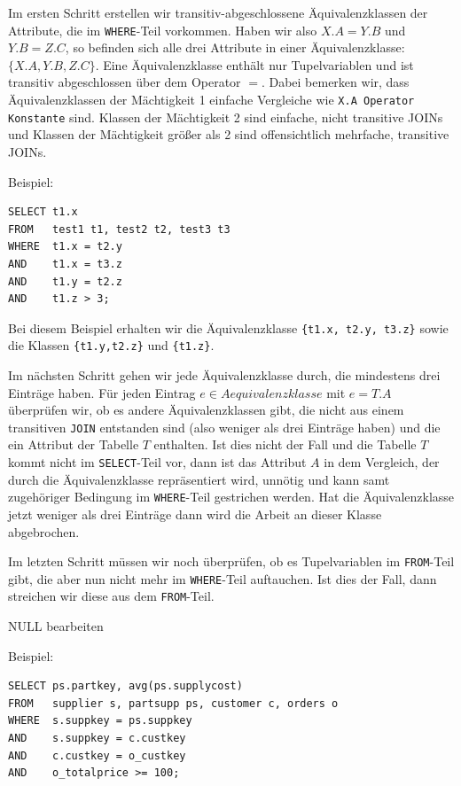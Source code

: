 Im ersten Schritt erstellen wir transitiv-abgeschlossene Äquivalenzklassen der Attribute, die im \verb|WHERE|-Teil vorkommen. Haben wir also $X.A=Y.B$ und $Y.B=Z.C$, so befinden sich alle drei Attribute in einer Äquivalenzklasse: $\{X.A,Y.B,Z.C\}$. Eine Äquivalenzklasse enthält nur Tupelvariablen und ist transitiv abgeschlossen über dem Operator $=$.
Dabei bemerken wir, dass Äquivalenzklassen der Mächtigkeit 1 einfache Vergleiche wie \verb|X.A Operator Konstante| sind. Klassen der Mächtigkeit 2 sind einfache, nicht transitive JOINs und Klassen der Mächtigkeit größer als 2 sind offensichtlich mehrfache, transitive JOINs.

Beispiel:
\begin{lstlisting}[mathescape]
SELECT t1.x 
FROM   test1 t1, test2 t2, test3 t3
WHERE  t1.x = t2.y
AND    t1.x = t3.z
AND    t1.y = t2.z
AND    t1.z > 3;
\end{lstlisting}

Bei diesem Beispiel erhalten wir die Äquivalenzklasse \verb|{t1.x, t2.y, t3.z}| sowie die Klassen \verb|{t1.y,t2.z}| und \verb|{t1.z}|.

Im nächsten Schritt gehen wir jede Äquivalenzklasse durch, die mindestens drei Einträge haben. Für jeden Eintrag $e\in\mathit{Aequivalenzklasse}$ mit $e=T.A$ überprüfen wir, ob es andere Äquivalenzklassen gibt, die nicht aus einem transitiven \verb|JOIN| entstanden sind (also weniger als drei Einträge haben) und die ein Attribut der Tabelle $T$ enthalten. Ist dies nicht der Fall und die Tabelle $T$ kommt nicht im \verb|SELECT|-Teil vor, dann ist das Attribut $A$ in dem Vergleich, der durch die Äquivalenzklasse repräsentiert wird, unnötig und kann samt zugehöriger Bedingung im \verb|WHERE|-Teil gestrichen werden. Hat die Äquivalenzklasse jetzt weniger als drei Einträge dann wird die Arbeit an dieser Klasse abgebrochen.

Im letzten Schritt müssen wir noch überprüfen, ob es Tupelvariablen im \verb|FROM|-Teil gibt, die aber nun nicht mehr im \verb|WHERE|-Teil auftauchen. Ist dies der Fall, dann streichen wir diese aus dem \verb|FROM|-Teil.

NULL bearbeiten

Beispiel:
\begin{lstlisting}[mathescape]
SELECT ps.partkey, avg(ps.supplycost)
FROM   supplier s, partsupp ps, customer c, orders o
WHERE  s.suppkey = ps.suppkey 
AND    s.suppkey = c.custkey
AND    c.custkey = o_custkey
AND    o_totalprice >= 100;
\end{lstlisting}

